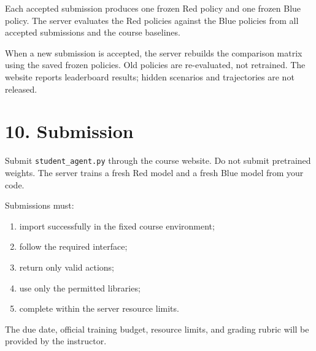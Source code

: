 \documentclass[12pt]{report}
\begin{document}
Each accepted submission produces one frozen Red policy and one frozen Blue
policy. The server evaluates the Red policies against the Blue policies from
all accepted submissions and the course baselines.

When a new submission is accepted, the server rebuilds the comparison matrix
using the saved frozen policies. Old policies are re-evaluated, not retrained.
The website reports leaderboard results; hidden scenarios and trajectories are
not released.

\section*{10. Submission}

Submit \texttt{student\_agent.py} through the course website. Do not submit
pretrained weights. The server trains a fresh Red model and a fresh Blue model
from your code.

Submissions must:

\begin{enumerate}[leftmargin=0.3in]
  \item import successfully in the fixed course environment;
  \item follow the required interface;
  \item return only valid actions;
  \item use only the permitted libraries;
  \item complete within the server resource limits.
\end{enumerate}

The due date, official training budget, resource limits, and grading rubric
will be provided by the instructor.
\end{document}
